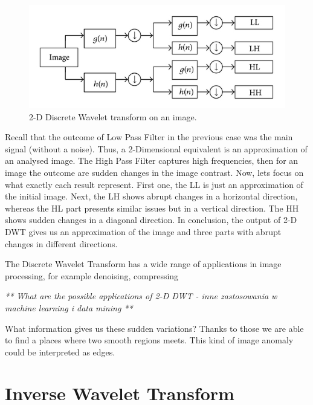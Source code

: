 \begin{figure}[h]
	\centering
	\includegraphics[width=\textwidth]{2D_DWT.JPG}
	\caption{2-D Discrete Wavelet transform on an image.}
	\label{fig:2D_DWT}
\end{figure}

Recall that the outcome of Low Pass Filter in the previous case was the main signal (without a noise). Thus, a 2-Dimensional equivalent is an approximation of an analysed image. The High Pass Filter captures high frequencies, then for an image the outcome are sudden changes in the image contrast. Now, lets focus on what exactly each result represent. First one, the LL is just an approximation of the initial image. Next, the LH shows abrupt changes in a horizontal direction, whereas the HL part presents similar issues but in a vertical direction. The HH shows sudden changes in a diagonal direction. In conclusion, the output of 2-D DWT gives us an approximation of the image and three parts with abrupt changes in different directions.

The Discrete Wavelet Transform has a wide range of applications in image processing, for example denoising, compressing 

\textit{** What are the possible applications of 2-D DWT - inne zastosowania w machine learning i data mining **}

What information gives us these sudden variations? Thanks to those we are able to find a places where two smooth regions meets. This kind of image anomaly could be interpreted as edges.

\section{Inverse Wavelet Transform}


